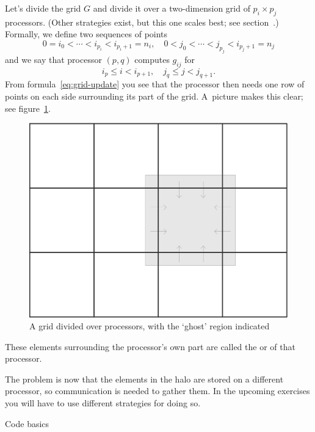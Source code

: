 Let's divide the grid $G$ and divide it over a two-dimension grid of
$p_i\times p_j$
processors. (Other strategies exist, but this one scales best; see
section~.)
Formally, we define two sequences of points
\[ 0=i_0<\cdots<i_{p_i}<i_{p_i+1}=n_i,\quad 
   0<j_0<\cdots<j_{p_j}<i_{p_j+1}=n_j
\]
and we say that processor $(p,q)$ computes $g_{ij}$ for
\[ i_p\leq i<i_{p+1}, \quad j_q\leq j<j_{q+1}.
\]
From formula~\eqref{eq:grid-update} you see that the processor then
needs one row of points on each side surrounding its part of the
grid. A~picture makes this clear; see figure~\ref{fig:ghost-grid}.
\begin{figure}
\includegraphics[scale=.1]{graphics/jacobi-average}
\caption{A grid divided over processors, with the `ghost' region indicated}
\label{fig:ghost-grid}
\end{figure}
These elements surrounding the processor's own part are called
the  or  of that processor.

The problem is now that the elements in the halo are stored on a
different processor, so communication is needed to gather them. In the
upcoming exercises you will have to use different strategies for doing
so.

 {Code basics}

